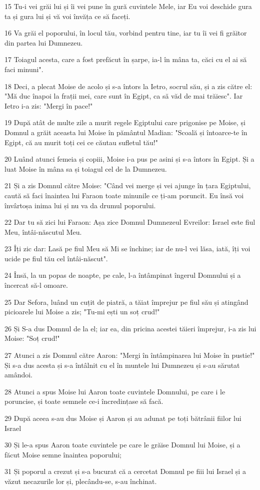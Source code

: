 \par 15 Tu-i vei grăi lui și îi vei pune în gură cuvintele Mele, iar Eu voi deschide gura ta și gura lui și vă voi învăța ce să faceți.
\par 16 Va grăi el poporului, în locul tău, vorbind pentru tine, iar tu îi vei fi grăitor din partea lui Dumnezeu.
\par 17 Toiagul acesta, care a fost prefăcut în șarpe, ia-l în mâna ta, căci cu el ai să faci minuni".
\par 18 Deci, a plecat Moise de acolo și s-a întors la Ietro, socrul său, și a zis către el: "Mă duc înapoi la frații mei, care sunt în Egipt, ca să văd de mai trăiesc". Iar Ietro i-a zis: "Mergi în pace!"
\par 19 După atât de multe zile a murit regele Egiptului care prigonise pe Moise, și Domnul a grăit aceasta lui Moise în pământul Madian: "Scoală și întoarce-te în Egipt, că au murit toți cei ce căutau sufletul tău!"
\par 20 Luând atunci femeia și copiii, Moise i-a pus pe asini și s-a întors în Egipt. Și a luat Moise în mâna sa și toiagul cel de la Dumnezeu.
\par 21 Și a zis Domnul către Moise: "Când vei merge și vei ajunge în țara Egiptului, caută să faci înaintea lui Faraon toate minunile ce ți-am poruncit. Eu însă voi învârtoșa inima lui și nu va da drumul poporului.
\par 22 Dar tu să zici lui Faraon: Așa zice Domnul Dumnezeul Evreilor: Israel este fiul Meu, întâi-născutul Meu.
\par 23 Îți zic dar: Lasă pe fiul Meu să Mi se închine; iar de nu-l vei lăsa, iată, îți voi ucide pe fiul tău cel întâi-născut".
\par 24 Însă, la un popas de noapte, pe cale, l-a întâmpinat îngerul Domnului și a încercat să-l omoare.
\par 25 Dar Sefora, luând un cuțit de piatră, a tăiat împrejur pe fiul său și atingând picioarele lui Moise a zis; "Tu-mi ești un soț crud!"
\par 26 Și S-a dus Domnul de la el; iar ea, din pricina acestei tăieri împrejur, i-a zis lui Moise: "Soț crud!"
\par 27 Atunci a zis Domnul către Aaron: "Mergi în întâmpinarea lui Moise în pustie!" Și s-a dus acesta și s-a întâlnit cu el în muntele lui Dumnezeu și s-au sărutat amândoi.
\par 28 Atunci a spus Moise lui Aaron toate cuvintele Domnului, pe care i le poruncise, și toate semnele ce-i încredințase să facă.
\par 29 După aceea s-au dus Moise și Aaron și au adunat pe toți bătrânii fiilor lui Israel
\par 30 Și le-a spus Aaron toate cuvintele pe care le grăise Domnul lui Moise, și a făcut Moise semne înaintea poporului;
\par 31 Și poporul a crezut și s-a bucurat că a cercetat Domnul pe fiii lui Israel și a văzut necazurile lor și, plecându-se, s-au închinat.

